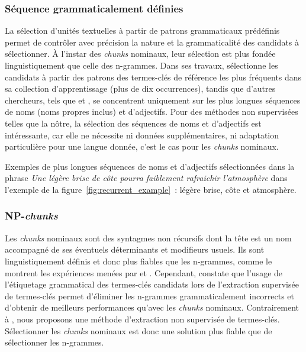       \subsubsection{Séquence grammaticalement définies}
      \label{subsubsec:main-state_of_the_art-automatic_keyphrase_extraction-automatic_keyphrase_extraction-pos_sequences}
        La sélection d'unités textuelles à partir de patrons grammaticaux
        prédéfinis permet de contrôler avec précision la nature et la
        grammaticalité des candidats à sélectionner. À l'instar des
        \textit{chunks} nominaux, leur sélection est plus fondée
        linguistiquement que celle des n-grammes. Dans ses travaux,
         sélectionne les candidats à partir
        des patrons des termes-clés de référence les plus fréquents dans sa
        collection d'apprentissage (plus de dix occurrences), tandis que
        d'autres chercheurs, tels que  et
        , se concentrent uniquement sur les plus
        longues séquences de noms (noms propres inclus) et d'adjectifs. Pour des
        méthodes non supervisées telles que la nôtre, la sélection des séquences
        de noms et d'adjectifs est intéressante, car elle ne nécessite ni
        données supplémentaires, ni adaptation particulière pour une langue
        donnée, c'est le cas pour les \textit{chunks} nominaux.

        Exemples de plus longues séquences de noms et d'adjectifs sélectionnées
        dans la phrase \textit{\og{}Une légère brise de côte pourra faiblement
        rafraichir l'atmosphère\fg{}} dans l'exemple de la
        figure~\ref{fig:recurrent_example}~: \og{}légère brise\fg{},
        \og{}côte\fg{} et \og{}atmosphère\fg{}.

      \subsubsection{NP-\textit{chunks}}
      \label{subsubsec:main-state_of_the_art-automatic_keyphrase_extraction-automatic_keyphrase_extraction-np_chunks}
        Les \textit{chunks} nominaux sont des syntagmes non récursifs dont la
        tête est un nom accompagné de ses éventuels déterminants et modifieurs
        usuels. Ils sont linguistiquement définis et donc plus fiables que les
        n-grammes, comme le montrent les expériences menées par
         et .
        Cependant,  constate que l'usage de
        l'étiquetage grammatical des termes-clés candidats lors de l'extraction
        supervisée de termes-clés permet d'éliminer les n-grammes
        grammaticalement incorrects et d'obtenir de meilleurs performances
        qu'avec les \textit{chunks} nominaux. Contrairement à
        , nous proposons une méthode
        d'extraction non supervisée de termes-clés. Sélectionner les
        \textit{chunks} nominaux est donc une solution plus fiable que de
        sélectionner les n-grammes.

